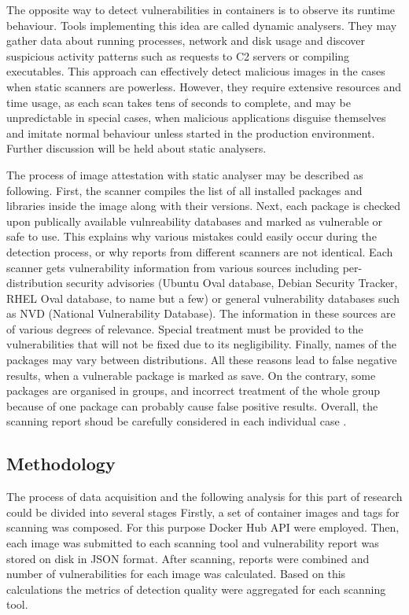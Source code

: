 The opposite way to detect vulnerabilities in containers is to observe its runtime behaviour. Tools implementing this idea are called dynamic analysers. They may gather data about running processes, network and disk usage and discover suspicious activity patterns such as requests to C2 servers or compiling executables. This approach can effectively detect malicious images in the cases when static scanners are powerless. However, they require extensive resources and time usage, as each scan takes tens of seconds to complete, and may be unpredictable in special cases, when malicious applications disguise themselves and imitate normal behaviour unless started in the production environment. Further discussion will be held about static analysers.

The process of image attestation with static analyser may be described as following. First, the scanner compiles the list of all installed packages and libraries inside the image along with their versions. Next, each package is checked upon publically available vulnreability databases and marked as vulnerable or safe to use. This explains why various mistakes could easily occur during the detection process, or why reports from different scanners are not identical. Each scanner gets vulnerability information from various sources including per-distribution security advisories (Ubuntu Oval database, Debian Security Tracker, RHEL Oval database, to name but a few) or general vulnerability databases such as NVD (National Vulnerability Database). The information in these sources are of various degrees of relevance. Special treatment must be provided to the vulnerabilities that will not be fixed due to its negligibility. Finally, names of the packages may vary between distributions. All these reasons lead to false negative results, when a vulnerable package is marked as save. On the contrary, some packages are organised in groups, and incorrect treatment of the whole group because of one package can probably cause false positive results. Overall, the scanning report shoud be carefully considered in each individual case \cite{book:rice}.


\subsection{Methodology}
The process of data acquisition and the following analysis for this part of research could be divided into several stages Firstly, a set of container images and tags for scanning was composed. For this purpose Docker Hub API were employed. Then, each image was submitted to each scanning tool and vulnerability report was stored on disk in JSON format. After scanning, reports were combined and number of vulnerabilities for each image was calculated. Based on this calculations the metrics of detection quality were aggregated for each scanning tool.

